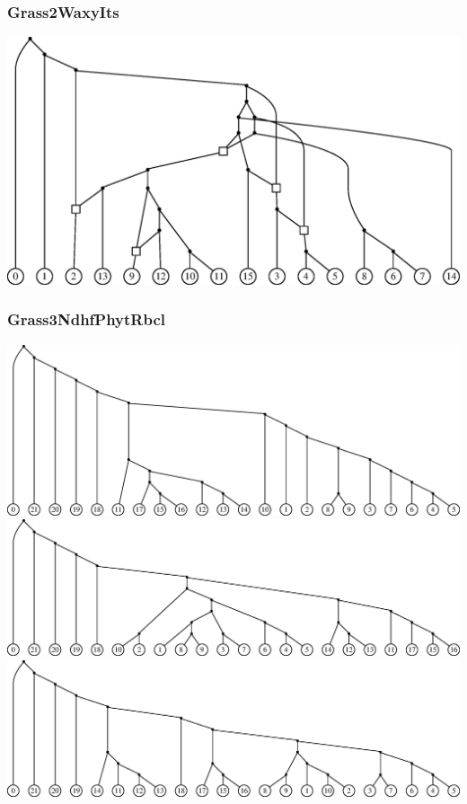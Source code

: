 \documentclass[hyperref={unicode}]{beamer}
\begin{document}
\begin{frame}
\frametitle{Grass2WaxyIts}

\includegraphics[width=\linewidth]{img/Grass2WaxyIts.eps}
	
\end{frame}

\begin{frame}
\frametitle{Grass3NdhfPhytRbcl}

\centering
\includegraphics[width=0.54\linewidth]{img/Grass3NdhfPhytRbcl_tree0.eps}
\\
\includegraphics[width=0.54\linewidth]{img/Grass3NdhfPhytRbcl_tree1.eps}
\\
\includegraphics[width=0.54\linewidth]{img/Grass3NdhfPhytRbcl_tree2.eps}

\end{frame}
\end{document}
